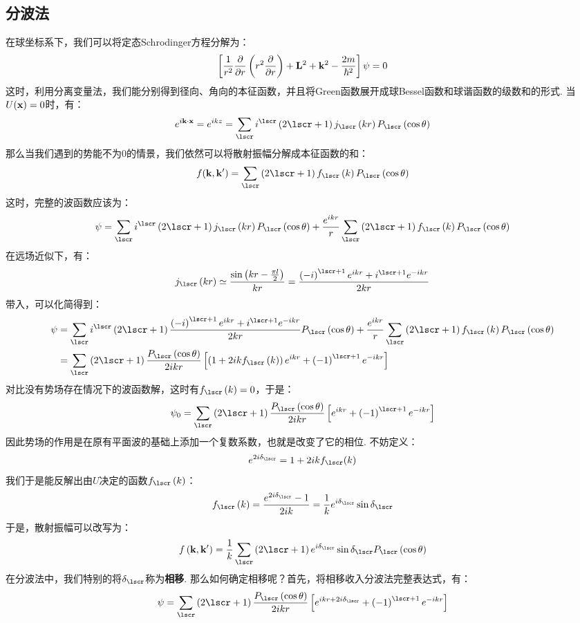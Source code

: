 \subsection{分波法}
在球坐标系下，我们可以将定态Schrodinger方程分解为：
\[
\left[{\frac{1}{r^{2}}\frac{\partial{}}{\partial{r}}\left({r^{2}\frac{\partial{}}{\partial{r}}}\right) + \mathbf{L}^{2} + \mathbf{k}^{2} - \frac{2m}{\hbar^{2}}}\right]\psi = 0 
\]
这时，利用分离变量法，我们能分别得到径向、角向的本征函数，并且将Green函数展开成球Bessel函数和球谐函数的级数和的形式. 当\(U(\mathbf{x}) = 0\)时，有：
\[
e^{i\vk\cdot\vr} = e^{ikz} = \sum_{\lscr}i^{\lscr}\br{2\lscr+1}j_{\lscr}\br{kr}P_{\lscr}\br{\cos\theta}
\]
那么当我们遇到的势能不为0的情景，我们依然可以将散射振幅分解成本征函数的和：
\[
f(\vk,\vk') = \sum_{\lscr}\br{2\lscr + 1}f_{\lscr}\br{k}P_{\lscr}\br{\cos\theta}
\]
这时，完整的波函数应该为：
\begin{align}
\psi 
& = \sum_{\lscr}i^{\lscr}\br{2\lscr + 1}j_{\lscr}\br{kr}P_{\lscr}\br{\cos\theta} + \frac{e^{ikr}}{r}\sum_{\lscr}\br{2\lscr + 1}f_{\lscr}\br{k}P_{\lscr}\br{\cos\theta} \\
\end{align}
在远场近似下，有：
\[
j_{\lscr}\br{kr} \simeq \frac{\sin\br{kr - \frac{\pi l}{2}}}{kr} = \frac{\br{-i}^{\lscr+1}e^{ikr} + i^{\lscr + 1}e^{-ikr}}{2kr}
\]
带入，可以化简得到：
\begin{align*}
\psi 
& = \sum_{\lscr}i^{\lscr}\br{2\lscr + 1}\frac{\br{-i}^{\lscr+1}e^{ikr} + i^{\lscr + 1}e^{-ikr}}{2kr}P_{\lscr}\br{\cos\theta} + \frac{e^{ikr}}{r}\sum_{\lscr}\br{2\lscr + 1}f_{\lscr}\br{k}P_{\lscr}\br{\cos\theta} \\
& = \sum_{\lscr}\br{2\lscr + 1}\frac{P_{\lscr}\br{\cos\theta}}{2ikr}\mbr{\br{1 + 2ikf_{\lscr}\br{k}}e^{ikr} + \br{-1}^{\lscr + 1}e^{-ikr}}
\end{align*}
对比没有势场存在情况下的波函数解，这时有\(f_{\lscr}\br{k} = 0\)，于是：
\[
\psi_{0} = \sum_{\lscr}\br{2\lscr + 1}\frac{P_{\lscr}\br{\cos\theta}}{2ikr}\mbr{e^{ikr} + \br{-1}^{\lscr + 1}e^{-ikr}}
\]
因此势场的作用是在原有平面波的基础上添加一个复数系数，也就是改变了它的相位. 不妨定义：
\[
e^{2i\delta_{\lscr}} = 1 + 2ikf_{\lscr}(k)
\]
我们于是能反解出由\(U\)决定的函数\(f_{\lscr}\br{k}\)：
\[
f_{\lscr}\br{k} = \frac{e^{2i\delta_{\lscr}} - 1}{2ik} = \frac{1}{k}e^{i\delta_{\lscr}}\sin\delta_{\lscr}
\]
于是，散射振幅可以改写为：
\[
f\br{\vk,\vk'} = \frac{1}{k}\sum_{\lscr}\br{2\lscr + 1}e^{i\delta_{\lscr}}\sin\delta_{\lscr}P_{\lscr}\br{\cos\theta}
\]
在分波法中，我们特别的将\(\delta_{\lscr}\)称为\textbf{相移}. 那么如何确定相移呢？首先，将相移收入分波法完整表达式，有：
\[
\psi = \sum_{\lscr}\br{2\lscr + 1}\frac{P_{\lscr}\br{\cos\theta}}{2ikr}\mbr{e^{ikr + 2i\delta_{\lscr}} + \br{-1}^{\lscr + 1}e^{-ikr}}
\]

